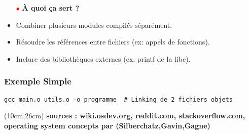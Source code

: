 \documentclass{article}
\begin{document}
\begin{itemize}
    \item[\textbf{\textcolor{red}{$\bullet$}}] \textbf{À quoi ça sert ?}
    \item Combiner plusieurs modules compilés séparément.
    \item Résoudre les références entre fichiers (ex: appels de fonctions).
    \item Inclure des bibliothèques externes (ex: printf de la libc).
\end{itemize}

\subsubsection*{Exemple Simple}
\begin{lstlisting}[language=ld]
    gcc main.o utils.o -o programme  # Linking de 2 fichiers objets
    \end{lstlisting}


\begin{textblock*}{10cm}(10cm,26cm) %
    \textbf{sources : wiki.osdev.org, reddit.com, stackoverflow.com, operating system concepts par (Silberchatz,Gavin,Gagne)}
\end{textblock*}
\end{document}
